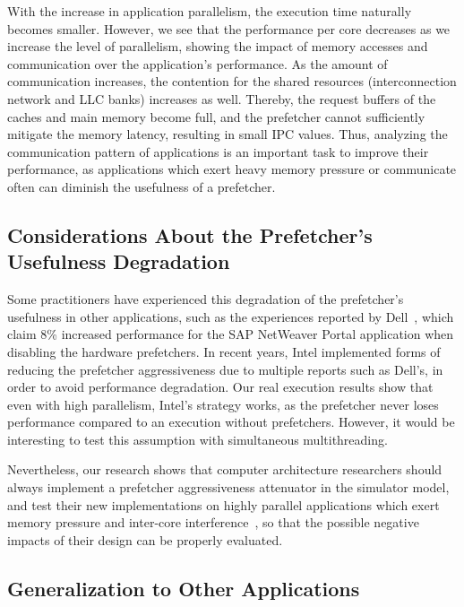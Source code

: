 \documentclass[AMA,final,STIX1COL]{WileyNJD-v2}
\begin{document}
{With the increase in application parallelism, the execution time naturally becomes smaller. 
However, we see that the performance per core decreases as we increase the level of parallelism, showing the impact of memory accesses and communication over the application's performance.
As the amount of communication increases, the contention for the shared resources (interconnection network and LLC banks) increases as well.
Thereby, the request buffers of the caches and main memory become full, and the prefetcher cannot sufficiently mitigate the memory latency, resulting in small IPC values.
Thus, analyzing the communication pattern of applications is an important task to improve their performance, as applications which exert heavy memory pressure or communicate often can diminish the usefulness of a prefetcher.


\subsection{Considerations About the Prefetcher's Usefulness Degradation}
\label{subsec:pref_usefulness_thoughts}
Some practitioners have experienced this degradation of the prefetcher's usefulness in other applications, such as the experiences reported by Dell~\cite{SAPguide}, which claim 8\% increased performance for the SAP NetWeaver Portal application when disabling the hardware prefetchers.
In recent years, Intel implemented forms of reducing the prefetcher aggressiveness due to multiple reports such as Dell's, in order to avoid performance degradation.
Our real execution results show that even with high parallelism, Intel's strategy works, as the prefetcher never loses performance compared to an execution without prefetchers.
However, it would be interesting to test this assumption with simultaneous multithreading.

Nevertheless, our research shows that computer architecture researchers should always implement a prefetcher aggressiveness attenuator in the simulator model, and test their new implementations on highly parallel applications which exert memory pressure and inter-core interference~\cite{ebrahimi2009coordinated}, so that the possible negative impacts of their design can be properly evaluated.


\subsection{Generalization to Other Applications}
\label{subsec:other_apps}

}
\end{document}
